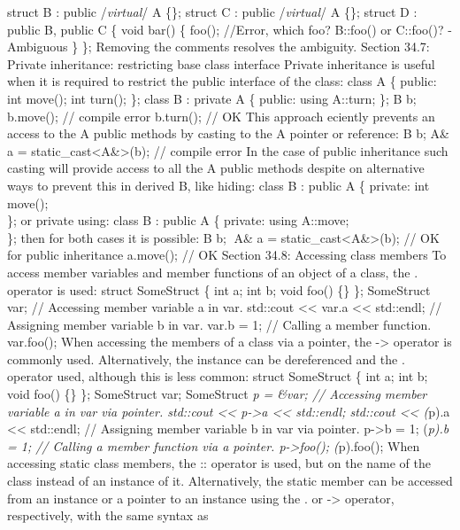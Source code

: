 struct B : public /\emph{virtual}/ A \{\}; struct C : public
/\emph{virtual}/ A \{\}; struct D : public B, public C \{ void bar() \{
foo(); //Error, which foo? B::foo() or C::foo()? - Ambiguous \} \};
Removing the comments resolves the ambiguity. Section 34.7: Private
inheritance: restricting base class interface Private inheritance is
useful when it is required to restrict the public interface of the
class: class A \{ public: int move(); int turn(); \}; class B : private
A \{ public: using A::turn; \}; B b; b.move(); // compile error
b.turn(); // OK This approach eciently prevents an access to the A
public methods by casting to the A pointer or reference: B b; A\& a =
static\_cast\textless A\&\textgreater(b); // compile error In the case
of public inheritance such casting will provide access to all the A
public methods despite on alternative ways to prevent this in derived B,
like hiding: class B : public A \{ private: int move();\\
\}; or private using: class B : public A \{ private: using A::move;\\
\}; then for both cases it is possible: B b; A\& a =
static\_cast\textless A\&\textgreater(b); // OK for public inheritance
a.move(); // OK Section 34.8: Accessing class members To access member
variables and member functions of an object of a class, the . operator
is used: struct SomeStruct \{ int a; int b; void foo() \{\} \};
SomeStruct var; // Accessing member variable a in var. std::cout
\textless\textless{} var.a \textless\textless{} std::endl; // Assigning
member variable b in var. var.b = 1; // Calling a member function.
var.foo(); When accessing the members of a class via a pointer, the
-\textgreater{} operator is commonly used. Alternatively, the instance
can be dereferenced and the . operator used, although this is less
common: struct SomeStruct \{ int a; int b; void foo() \{\} \};
SomeStruct var; SomeStruct \emph{p = \&var; // Accessing member variable
a in var via pointer. std::cout \textless\textless{} p-\textgreater a
\textless\textless{} std::endl; std::cout \textless\textless{} (}p).a
\textless\textless{} std::endl; // Assigning member variable b in var
via pointer. p-\textgreater b = 1; (\emph{p).b = 1; // Calling a member
function via a pointer. p-\textgreater foo(); (}p).foo(); When accessing
static class members, the :: operator is used, but on the name of the
class instead of an instance of it. Alternatively, the static member can
be accessed from an instance or a pointer to an instance using the . or
-\textgreater{} operator, respectively, with the same syntax as
